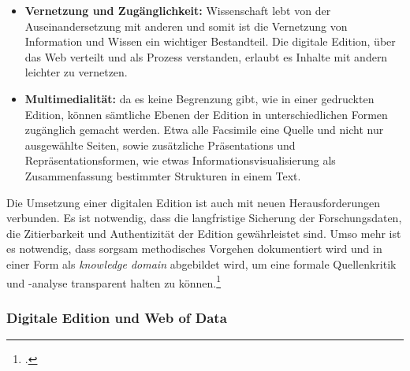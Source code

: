 \documentclass[12pt,a4paper]{article}
\begin{document}
{\begin{itemize}
\item \textbf{Vernetzung und Zugänglichkeit:} Wissenschaft lebt von der Auseinandersetzung mit anderen und somit ist die Vernetzung von Information und Wissen ein wichtiger Bestandteil. Die digitale Edition, über das Web verteilt und als Prozess verstanden, erlaubt es Inhalte mit andern leichter zu vernetzen.  
\item 
\textbf{Multimedialität:} da es keine Begrenzung gibt, wie in einer gedruckten Edition, können sämtliche Ebenen der Edition in unterschiedlichen Formen zugänglich gemacht werden. Etwa alle Facsimile eine Quelle und nicht nur ausgewählte Seiten, sowie zusätzliche Präsentations und Repräsentationsformen, wie etwas Informationsvisualisierung als Zusammenfassung bestimmter Strukturen in einem Text. 
\end{itemize}
Die Umsetzung einer digitalen Edition ist auch mit neuen Herausforderungen verbunden. Es ist notwendig, dass die langfristige Sicherung der Forschungsdaten, die Zitierbarkeit und Authentizität der Edition gewährleistet sind. Umso mehr ist es notwendig, dass sorgsam methodisches Vorgehen dokumentiert wird und in einer Form als \textit{knowledge domain} abgebildet wird, um eine formale Quellenkritik und -analyse transparent halten zu können.\footcite[][S.306-315]{kropavc2004theorien}
}

\subsubsection{Digitale Edition und Web of Data}
\end{document}
